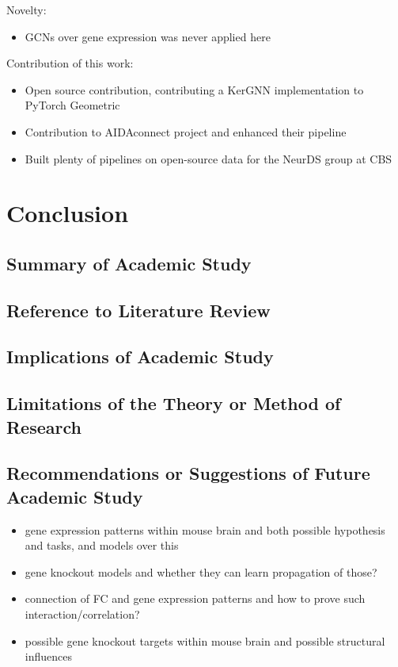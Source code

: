 \documentclass[]{article}
\begin{document}
Novelty:
\begin{itemize}
	\item GCNs over gene expression was never applied here
\end{itemize}

Contribution of this work:
\begin{itemize}
	\item Open source contribution, contributing a KerGNN implementation to PyTorch Geometric
	\item Contribution to AIDAconnect project and enhanced their pipeline
	\item Built plenty of pipelines on open-source data for the NeurDS group at CBS
\end{itemize}



\newpage
\section{Conclusion}
\label{sec:conclusion}

\subsection*{Summary of Academic Study}
\subsection*{Reference to Literature Review}
\subsection*{Implications of Academic Study}
\subsection*{Limitations of the Theory or Method of Research}
\subsection*{Recommendations or Suggestions of Future Academic Study}

\begin{itemize}
	\item gene expression patterns within mouse brain and both possible hypothesis and tasks, and models over this
	\item gene knockout models and whether they can learn propagation of those?
	\item connection of FC and gene expression patterns and how to prove such interaction/correlation?
	\item possible gene knockout targets within mouse brain and possible structural influences
\end{itemize}


\newpage



\newpage

\appendix
\end{document}
